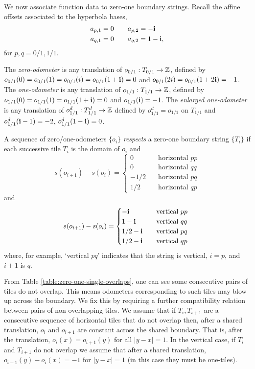 \documentclass[12pt]{amsart}
\begin{document}
We now associate function data to zero-one boundary strings.  Recall the affine offsets associated to the hyperbola bases,
\[
\begin{aligned}
a_{p,1} &= 0 \qquad a_{p,2} = -\mathbf{i} \\
a_{q,1} &= 0 \qquad a_{q,2} = 1-\mathbf{i},
\end{aligned}
\]
for $p,q = 0/1, 1/1$. 


The {\it zero-odometer} is any translation of $o_{0/1}:T_{0/1} \to \mathbb{Z}$, defined by $o_{0/1}(0)=o_{0/1}(1) = o_{0/1}(i) = o_{0/1}(1+ \mathbf{i}) = 0$ and $o_{0/1}(2 i) = o_{0/1}(1 + 2 \mathbf{i}) = -1$.  The {\it one-odometer} is any translation of $o_{1/1}:T_{1/1} \to \mathbb{Z}$, defined by $o_{1/1}(0)=o_{1/1}(1)=o_{1/1}(1+ \mathbf{i})=0$ and $o_{1/1}(\mathbf{i}) = -1$. The {\it enlarged one-odometer} is any translation of $o_{1/1}^d : T_{1/1}^d \to \mathbb{Z}$ defined by $o_{1/1}^d = o_{1/1}$ on $T_{1/1}$ and $o_{1/1}^d(\mathbf{i}-1)=-2$, $o_{1/1}^d(1-\mathbf{i}) = 0$. 


A sequence of zero/one-odometers $\{o_i\}$ {\it respects} a zero-one boundary string $\{T_i\}$ if each successive tile $T_i$ 
is the domain of $o_i$ and 
\begin{equation} \label{eq:zero-one-odometer_slopes-horizontal}
s(o_{i+1}) - s(o_{i}) = 
\begin{cases}
	0 	 &\quad\mbox{horizontal $p p$} \\
	0 	 &\quad\mbox{horizontal $q q$} \\
	-1/2 	 &\quad\mbox{horizontal $p q$} \\
	1/2 	 &\quad\mbox{horizontal $q p$} 
\end{cases} 
\end{equation}
and
\begin{equation} \label{eq:zero-one-odometer_slopes-vert}
	s(o_{i+1}) - s(o_{i}) = 
	\begin{cases}
		-\mathbf{i} 	 &\quad\mbox{vertical $p p$ } \\
		1-\mathbf{i} 	 &\quad\mbox{vertical $q q$ } \\
		1/2 - \mathbf{i} 	 &\quad\mbox{vertical $p q$ } \\
		1/2 - \mathbf{i} 	 &\quad\mbox{vertical $q p$ } 
	\end{cases} 
\end{equation}
where, for example, `vertical $pq$' indicates that the string is vertical, $i = p$, and $i+1$ is $q$. 

From Table \ref{table:zero-one-single-overlaps}, one can see some consecutive 
pairs of tiles do not overlap. This means odometers corresponding to such tiles may blow up across the boundary. We fix this by requiring a further compatibility relation between pairs of non-overlapping 
tiles. We assume that if $T_i, T_{i+1}$ are a consecutive sequence of horizontal tiles that do not overlap %
then, after a shared translation, $o_i$ and $o_{i+1}$ are constant across the shared boundary. That is, after the translation, $o_i(x) = o_{i+1}(y)$
for all $|y-x| =1$.  In the vertical case, if $T_i$ and $T_{i+1}$ do not overlap
we assume that after a shared translation, $o_{i+1}(y)-o_{i}(x) =-1$ for $|y-x| = 1$ (in this case they must be one-tiles).   
\end{document}
